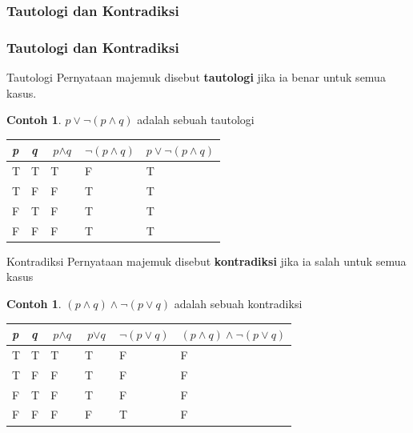 \documentclass[handout]{beamer}
\theoremstyle{definition}
\theoremstyle{example}
\newtheorem{contoh}[theorem]{Contoh}
\begin{document}
\subsubsection{Tautologi dan Kontradiksi}
\begin{frame}[shrink]
	\frametitle{Tautologi dan Kontradiksi}

	\begin{block}{Tautologi}
    Pernyataan majemuk disebut \textbf{tautologi} jika ia benar untuk semua kasus.    
    \end{block}	
    \begin{contoh}
      $p \vee \neg(p \wedge q)$ adalah sebuah tautologi\\
      \begin{tabular}{ | l | l | l | l | l |}
      	\hline
      	\textit{p} & \textit{q} &  $\textit{p}\wedge\textit{q}$ & $\neg(\textit{p}\wedge\textit{q})$ & $p \vee \neg(p \wedge q)$ \\ \hline
      	T &  T & T & F & T\\ \hline
      	T &  F & F & T & T \\ \hline
      	F &  T & F & T & T\\ \hline
      	F &  F & F & T & T\\     		 
      	\hline
      \end{tabular}
    \end{contoh}
    \begin{block}{Kontradiksi}
    	Pernyataan majemuk disebut \textbf{kontradiksi} jika ia salah untuk semua kasus
    \end{block}
    \begin{contoh}
    $(p \wedge q)\wedge\neg(p \vee q)$ adalah sebuah kontradiksi\\
    \begin{tabular}{ | l | l | l | l | l | l |}
    	\hline
    	\textit{p} & \textit{q} &  $\textit{p}\wedge\textit{q}$ & 
    	$\textit{p}\vee\textit{q}$ &
    	$\neg(\textit{p}\vee\textit{q})$ & $(p \wedge q)\wedge\neg(p \vee q)$ \\ \hline
    	T &  T & T & T & F & F\\ \hline
    	T &  F & F & T & F & F \\ \hline
    	F &  T & F & T & F & F\\ \hline
    	F &  F & F & F & T & F\\     		 
    	\hline
    \end{tabular}	
    \end{contoh}
\end{frame}	
\end{document}
